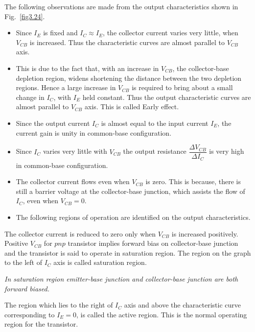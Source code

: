 The following observations are made from the output characteristics shown in Fig.~\ref{fig3.24}.
\begin{itemize}
\item Since $I_{E}$ is fixed and $I_{C}\approx I_{E}$, the collector current varies very little, when $V_{CB}$ is increased. Thus the characteristic curves are almost parallel to $V_{CB}$ axis.

\item This is due to the fact that, with an increase in $V_{CB}$, the collector-base depletion region, widens shortening the distance between the two depletion regions. Hence a large increase in $V_{CB}$ is required to bring about a small change in $I_{C}$, with $I_{E}$ held constant. Thus the output characteristic curves are almost parallel to $V_{CB}$ axis. This is called Early effect.

\item Since the output current $I_{C}$ is almost equal to the input current $I_{E}$, the current gain is unity in common-base configuration.

\item Since $I_{C}$ varies very little with $V_{CB}$ the output resistance $\dfrac{\Delta V_{CB}}{\Delta I_{C}}$ is very high in common-base configuration.

\item The collector current flows even when $V_{CB}$ is zero. This is because, there is still a barrier voltage at the collector-base junction, which assists the flow of $I_{C}$, even when $V_{CB}=0$.

\item The following regions of operation are identified on the output characteristics. 
\end{itemize}

\smallskip
{}

The collector current is reduced to zero only when $V_{CB}$ is increased positively. Positive $V_{CB}$ for $pnp$ transistor implies forward bias on collector-base junction and the transistor is said to operate in saturation region. The region on the graph to the left of $I_{C}$ axis is called saturation region. 

{\em In saturation region emitter-base junction and collector-base junction are both forward biased.}

\smallskip
{}


The region which lies to the right of $I_{C}$ axis and above the characteristic curve corresponding to $I_{E}=0$, is called the active region. This is the normal operating region for the transistor.

